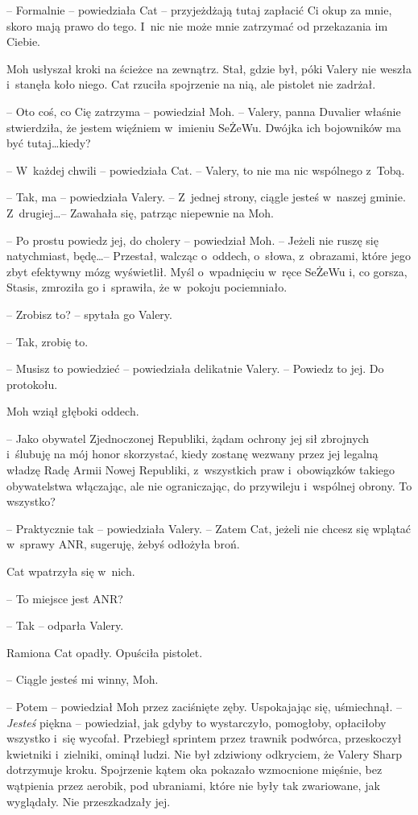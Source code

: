 \documentclass[oneside,polish,11pt,sfheadings]{mwbk}
\begin{document}
-- Formalnie -- powiedziała Cat -- przyjeżdżają tutaj zapłacić Ci okup za
mnie, skoro mają prawo do tego. I~nic nie może mnie zatrzymać od
przekazania im Ciebie.

Moh usłyszał kroki na ścieżce na zewnątrz. Stał, gdzie był, póki Valery
nie weszła i~stanęła koło niego. Cat rzuciła spojrzenie na nią, ale
pistolet nie zadrżał.

-- Oto coś, co Cię zatrzyma -- powiedział Moh. -- Valery, panna Duvalier
właśnie stwierdziła, że jestem więźniem w~imieniu SeŻeWu. Dwójka ich
bojowników ma być tutaj\ldots kiedy?

-- W~każdej chwili -- powiedziała Cat. -- Valery, to nie ma nic wspólnego z~Tobą.

-- Tak, ma -- powiedziała Valery. -- Z~jednej strony, ciągle jesteś w~naszej gminie. Z~drugiej\ldots -- Zawahała się, patrząc niepewnie na Moh.

-- Po prostu powiedz jej, do cholery -- powiedział Moh. -- Jeżeli nie ruszę
się natychmiast, będę\ldots -- Przestał, walcząc o~oddech, o~słowa, z~obrazami, które jego zbyt efektywny mózg wyświetlił. Myśl o~wpadnięciu w~ręce SeŻeWu i, co gorsza, Stasis, zmroziła go i~sprawiła, że w~pokoju
pociemniało.

-- Zrobisz to? -- spytała go Valery.

-- Tak, zrobię to.

-- Musisz to powiedzieć -- powiedziała delikatnie Valery. -- Powiedz to
jej. Do protokołu.

Moh wziął głęboki oddech. 

-- Jako obywatel Zjednoczonej Republiki, żądam
ochrony jej sił zbrojnych i~ślubuję na mój honor skorzystać, kiedy
zostanę wezwany przez jej legalną władzę Radę Armii Nowej Republiki, z~wszystkich praw i~obowiązków takiego obywatelstwa włączając, ale nie
ograniczając, do przywileju i~wspólnej obrony. To wszystko?

-- Praktycznie tak -- powiedziała Valery. -- Zatem Cat, jeżeli nie chcesz
się wplątać w~sprawy ANR, sugeruję, żebyś odłożyła broń.

Cat wpatrzyła się w~nich. 

-- To miejsce jest ANR?

-- Tak -- odparła Valery.

Ramiona Cat opadły. Opuściła pistolet.

-- Ciągle jesteś mi winny, Moh.

-- Potem -- powiedział Moh przez zaciśnięte zęby. Uspokajając się,
uśmiechnął. -- \emph{Jesteś} piękna -- powiedział, jak gdyby to
wystarczyło, pomogłoby, opłaciłoby wszyst\-ko i~się wycofał. Przebiegł
sprintem przez trawnik podwórca, przeskoczył kwietniki i~zielniki,
ominął ludzi. Nie był zdziwiony odkryciem, że Valery Sharp dotrzymuje
kroku. Spojrzenie kątem oka pokazało wzmocnione mięśnie, bez wątpienia
przez aerobik, pod ubraniami, które nie były tak zwariowane, jak
wyglądały. Nie przeszkadzały jej.
\end{document}
